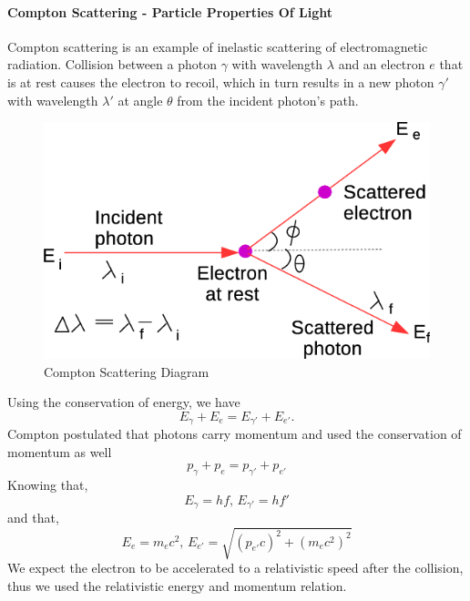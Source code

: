 		\paragraph{Compton Scattering - Particle Properties Of Light}
		Compton scattering is an example of inelastic scattering of electromagnetic radiation. Collision between a photon $\gamma$ with wavelength $\lambda$ and an electron $e$ that is at rest causes the electron to recoil, which in turn results in a new photon $\gamma'$ with wavelength $\lambda'$ at angle $\theta$ from the incident photon's path. 
		\begin{figure}[h]
			\caption{Compton Scattering Diagram}
			\centering
			\includegraphics[width=\textwidth ]{images/compton_scattering.png}
		\end{figure}
		Using the conservation of energy, we have
		\begin{equation}
			E_\gamma + E_e = E_{\gamma'} + E_{e'}.
		\end{equation}
		Compton postulated that photons carry momentum and used the conservation of momentum as well
		\begin{equation}
			p_\gamma + p_e = p_{\gamma'} + p_{e'}
		\end{equation}
		Knowing that,
		\begin{equation}
			E_\gamma = h f \text{, } E_{\gamma'} = h f'
		\end{equation}
		and that,
		\begin{equation}
			E_e = m_e c^2 \text{, } E_{e'} = \sqrt{(p_{e'} c)^2 + (m_e c^2)^2}
		\end{equation}
		We expect the electron to be accelerated to a relativistic speed after the collision, thus we used the relativistic energy and momentum relation.
		\\
